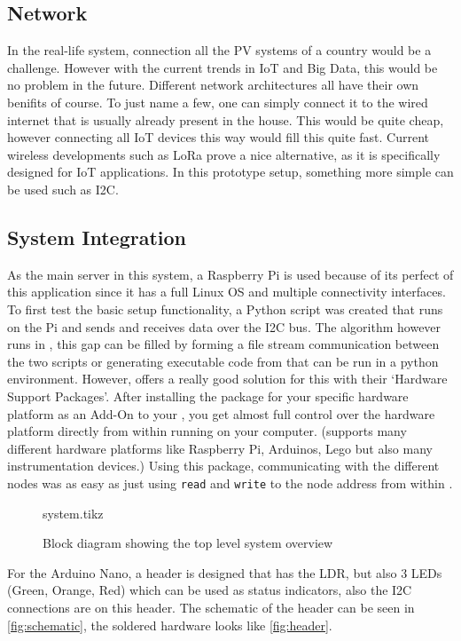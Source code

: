 \documentclass[a4paper,journal]{DDREAM}
\begin{document}
\subsection{Network}
In the real-life system, connection all the PV systems of a country would be a challenge.
However with the current trends in IoT and Big Data, this would be no problem in the future.
Different network architectures all have their own benifits of course.
To just name a few, one can simply connect it to the wired internet that is usually already present in the house.
This would be quite cheap, however connecting all IoT devices this way would fill this quite fast.
Current wireless developments such as LoRa prove a nice alternative, as it is specifically designed for IoT applications.
In this prototype setup, something more simple can be used such as I2C.

\subsection{System Integration}
As the main server in this system, a Raspberry Pi is used because of its perfect of this application since it has a full Linux OS and multiple connectivity interfaces.
To first test the basic setup functionality, a Python script was created that runs on the Pi and sends and receives data over the I2C bus.
The algorithm however runs in \matlab, this gap can be filled by forming a file stream communication between the two scripts or generating executable code from \matlab that can be run in a python environment.
However, \matlab offers a really good solution for this with their `Hardware Support Packages'.
After installing the package for your specific hardware platform as an Add-On to your \matlab, you get almost full control over the hardware platform directly from within \matlab running on your computer.
(\matlab supports many different hardware platforms like Raspberry Pi, Arduinos, Lego but also many instrumentation devices.)
Using this package, communicating with the different nodes was as easy as just using \texttt{read} and \texttt{write} to the node address from within \matlab.


\begin{figure}[H]
\centering
    {system.tikz}
    \caption{Block diagram showing the top level system overview}
    \label{fig:system}
\end{figure}

For the Arduino Nano, a header is designed that has the LDR, but also 3 LEDs (Green, Orange, Red) which can be used as status indicators, also the I2C connections are on this header.
The schematic of the header can be seen in \autoref{fig:schematic}, the soldered hardware looks like \autoref{fig:header}.
\end{document}
